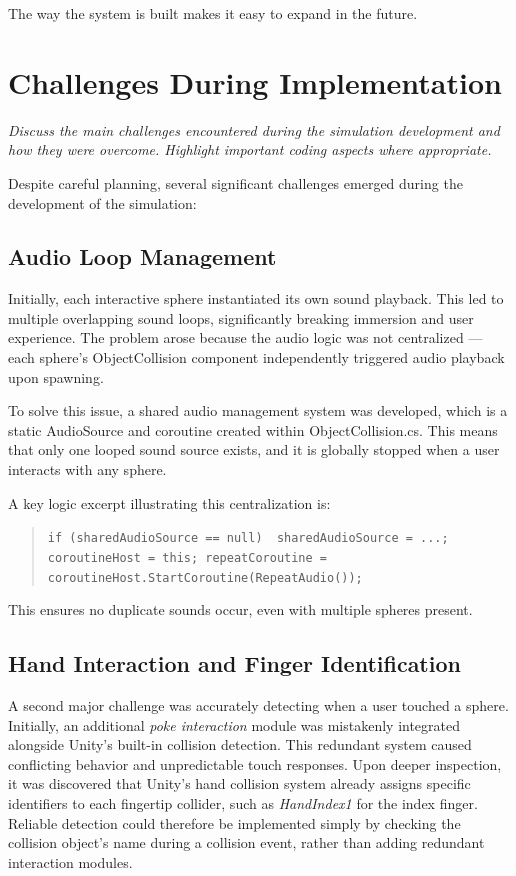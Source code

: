 The way the system is built makes it easy to expand in the future.

\section{Challenges During Implementation} \emph{Discuss the main challenges encountered during the simulation development and how they were overcome. Highlight important coding aspects where appropriate.}

Despite careful planning, several significant challenges emerged during the development of the simulation:

\subsection{Audio Loop Management} Initially, each interactive sphere instantiated its own sound playback. This led to multiple overlapping sound loops, significantly breaking immersion and user experience. The problem arose because the audio logic was not centralized — each sphere's ObjectCollision component independently triggered audio playback upon spawning.

To solve this issue, a shared audio management system was developed, which is a static AudioSource and coroutine created within ObjectCollision.cs. This means that only one looped sound source exists, and it is globally stopped when a user interacts with any sphere.

A key logic excerpt illustrating this centralization is:

\begin{quote} \small \texttt{if (sharedAudioSource == null) { sharedAudioSource = ...; coroutineHost = this; repeatCoroutine = coroutineHost.StartCoroutine(RepeatAudio());}} \end{quote}

This ensures no duplicate sounds occur, even with multiple spheres present.

\subsection{Hand Interaction and Finger Identification} 
A second major challenge was accurately detecting when a user touched a sphere. Initially, an additional \textit{poke interaction} module was mistakenly integrated alongside Unity's built-in collision detection. This redundant system caused conflicting behavior and unpredictable touch responses. Upon deeper inspection, it was discovered that Unity’s hand collision system already assigns specific identifiers to each fingertip collider, such as \textit{HandIndex1} for the index finger. Reliable detection could therefore be implemented simply by checking the collision object's name during a collision event, rather than adding redundant interaction modules.

